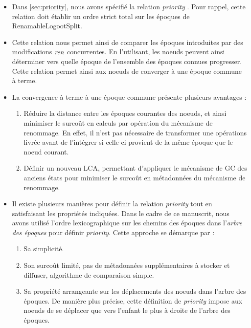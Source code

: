 \label{sec:alternative-priority}

\begin{itemize}
    \item Dans \autoref{sec:priority}, nous avons spécifié la relation \emph{priority} .
        Pour rappel, cette relation doit établir un ordre strict total sur les époques de RenamableLogootSplit.
    \item Cette relation nous permet ainsi de comparer les époques introduites par des modifications $\mathit{ren}$ concurrentes.
        En l'utilisant, les noeuds peuvent ainsi déterminer vers quelle époque de l'ensemble des époques connues progresser.
        Cette relation permet ainsi aux noeuds de converger à une époque commune à terme.
    \item La convergence à terme à une époque commune présente plusieurs avantages :
        \begin{enumerate}
            \item Réduire la distance entre les époques courantes des noeuds, et ainsi minimiser le surcoût en calculs par opération du mécanisme de renommage.
                En effet, il n'est pas nécessaire de transformer une opérations livrée avant de l'intégrer si celle-ci provient de la même époque que le noeud courant.
            \item Définir un nouveau \ac{LCA}, permettant d'appliquer le mécanisme de \ac{GC} des anciens états pour minimiser le surcoût en métadonnées du mécanisme de renommage.
        \end{enumerate}
    \item Il existe plusieurs manières pour définir la relation \emph{priority} tout en satisfaisant les propriétés indiquées.
        Dans le cadre de ce manuscrit, nous avons utilisé l'ordre lexicographique sur les chemins des époques dans l'\emph{arbre des époques} pour définir \emph{priority}.
        Cette approche se démarque par :
        \begin{enumerate}
            \item Sa simplicité.
            \item Son surcoût limité, \ie pas de métadonnées supplémentaires à stocker et diffuser, algorithme de comparaison simple.
            \item Sa propriété arrangeante sur les déplacements des noeuds dans l'arbre des époques.
                De manière plus précise, cette définition de \emph{priority} impose aux noeuds de se déplacer que vers l'enfant le plus à droite de l'arbre des époques.

\end{enumerate}
\end{itemize}
